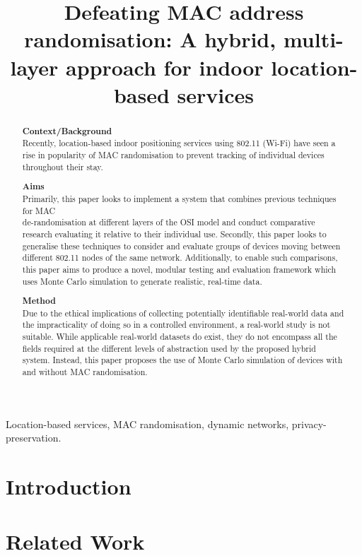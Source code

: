 \documentclass[12pt,a4paper]{article}
\title{Defeating MAC address randomisation: A hybrid, multi-layer approach for indoor location-based services}
\author{}
\date{}
\newcommand{\absdiv}[1]{%
  \par\textbf{#1}\quad\ignorespaces \\
}
\begin{document}
    \maketitle

    \begin{abstract}
        \absdiv{Context/Background}
        Recently, location-based indoor positioning services using 802.11 (Wi-Fi) have seen a rise in popularity of MAC randomisation to prevent tracking of individual devices throughout their stay.

        \absdiv{Aims}
        Primarily, this paper looks to implement a system that combines previous techniques for MAC \\ de-randomisation at different layers of the OSI model and conduct comparative research evaluating it relative to their individual use.
        Secondly, this paper looks to generalise these techniques to consider and evaluate groups of devices moving between different 802.11 nodes of the same network.
        Additionally, to enable such comparisons, this paper aims to produce a novel, modular testing and evaluation framework which uses Monte Carlo simulation to generate realistic, real-time data.
        
        \absdiv{Method}
        Due to the ethical implications of collecting potentially identifiable real-world data and the impracticality of doing so in a controlled environment, a real-world study is not suitable.
        While applicable real-world datasets do exist, they do not encompass all the fields required at the different levels of abstraction used by the proposed hybrid system.
        Instead, this paper proposes the use of Monte Carlo simulation of devices with and without MAC randomisation.

    \end{abstract}

    \begin{keywords}
        Location-based services, MAC randomisation, dynamic networks, privacy-preservation.
    \end{keywords}

    \section{Introduction}\label{sec:introduction}
    

    \section{Related Work}\label{sec:related-work}
    
\end{document}
